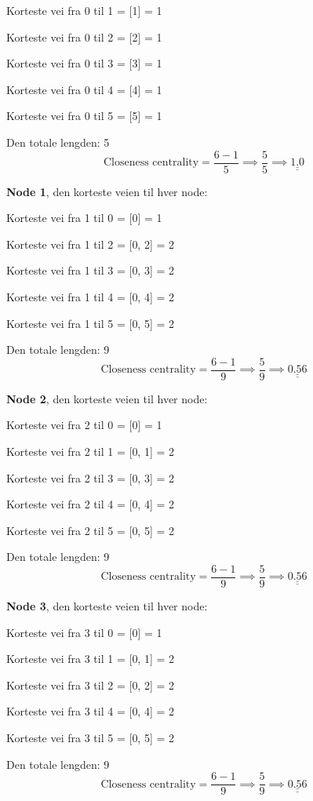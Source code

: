 \documentclass[11pt]{article}
\begin{document}
Korteste vei fra 0 til 1 = {[}1{]} = 1

Korteste vei fra 0 til 2 = {[}2{]} = 1

Korteste vei fra 0 til 3 = {[}3{]} = 1

Korteste vei fra 0 til 4 = {[}4{]} = 1

Korteste vei fra 0 til 5 = {[}5{]} = 1

Den totale lengden: 5
\[\text{Closeness centrality} = \frac{6 - 1}{5} \implies \frac{5}{5} \implies\underline{\underline{ 1.0 }}\]

\textbf{Node 1}, den korteste veien til hver node:

Korteste vei fra 1 til 0 = {[}0{]} = 1

Korteste vei fra 1 til 2 = {[}0, 2{]} = 2

Korteste vei fra 1 til 3 = {[}0, 3{]} = 2

Korteste vei fra 1 til 4 = {[}0, 4{]} = 2

Korteste vei fra 1 til 5 = {[}0, 5{]} = 2

Den totale lengden: 9
\[\text{Closeness centrality} = \frac{6 - 1}{9} \implies \frac{5}{9} \implies\underline{\underline{ 0.56 }}\]

\textbf{Node 2}, den korteste veien til hver node:

Korteste vei fra 2 til 0 = {[}0{]} = 1

Korteste vei fra 2 til 1 = {[}0, 1{]} = 2

Korteste vei fra 2 til 3 = {[}0, 3{]} = 2

Korteste vei fra 2 til 4 = {[}0, 4{]} = 2

Korteste vei fra 2 til 5 = {[}0, 5{]} = 2

Den totale lengden: 9
\[\text{Closeness centrality} = \frac{6 - 1}{9} \implies \frac{5}{9} \implies\underline{\underline{ 0.56 }}\]

\textbf{Node 3}, den korteste veien til hver node:

Korteste vei fra 3 til 0 = {[}0{]} = 1

Korteste vei fra 3 til 1 = {[}0, 1{]} = 2

Korteste vei fra 3 til 2 = {[}0, 2{]} = 2

Korteste vei fra 3 til 4 = {[}0, 4{]} = 2

Korteste vei fra 3 til 5 = {[}0, 5{]} = 2

Den totale lengden: 9
\[\text{Closeness centrality} = \frac{6 - 1}{9} \implies \frac{5}{9} \implies\underline{\underline{ 0.56 }}\]
\end{document}
